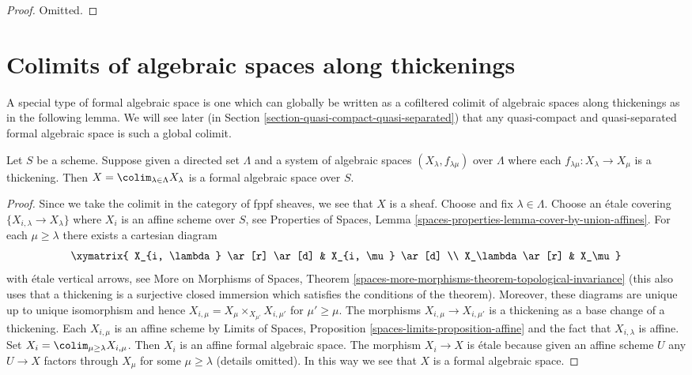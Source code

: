 \begin{proof}
Omitted.
\end{proof}






\section{Colimits of algebraic spaces along thickenings}
\label{section-global-colimits}

\noindent
A special type of formal algebraic space is one which can globally
be written as a cofiltered colimit of algebraic spaces along
thickenings as in the following lemma. We will see later
(in Section \ref{section-quasi-compact-quasi-separated})
that any quasi-compact and quasi-separated formal algebraic space
is such a global colimit.

\begin{lemma}
\label{lemma-colimit-is-formal}
Let $S$ be a scheme. Suppose given a directed set
$\Lambda$ and a system of algebraic spaces $(X_\lambda, f_{\lambda \mu})$
over $\Lambda$ where each $f_{\lambda \mu} : X_\lambda \to X_\mu$ is a
thickening. Then $X = \colim_{\lambda \in \Lambda} X_\lambda$
is a formal algebraic space over $S$.
\end{lemma}

\begin{proof}
Since we take the colimit in the category of fppf sheaves, we
see that $X$ is a sheaf. Choose and fix $\lambda \in \Lambda$. Choose an
\'etale covering $\{X_{i, \lambda} \to X_\lambda\}$ where $X_i$ is an affine
scheme over $S$, see Properties of Spaces, Lemma
\ref{spaces-properties-lemma-cover-by-union-affines}.
For each $\mu \geq \lambda$ there exists a cartesian diagram
$$
\xymatrix{
X_{i, \lambda} \ar[r] \ar[d] & X_{i, \mu} \ar[d] \\
X_\lambda \ar[r] & X_\mu
}
$$
with \'etale vertical arrows, see
More on Morphisms of Spaces, Theorem
\ref{spaces-more-morphisms-theorem-topological-invariance}
(this also uses that a thickening is a surjective closed immersion which
satisfies the conditions of the theorem). Moreover, these diagrams are
unique up to unique isomorphism and hence
$X_{i, \mu} = X_\mu \times_{X_{\mu'}} X_{i, \mu'}$ for
$\mu' \geq \mu$. The morphisms $X_{i, \mu} \to X_{i, \mu'}$
is a thickening as a base change of a thickening. Each $X_{i, \mu}$
is an affine scheme by Limits of Spaces, Proposition
\ref{spaces-limits-proposition-affine} and the fact that
$X_{i, \lambda}$ is affine.
Set $X_i = \colim_{\mu \geq \lambda} X_{i, \mu}$. Then $X_i$ is
an affine formal algebraic space. The morphism $X_i \to X$
is \'etale because given an affine scheme $U$ any $U \to X$
factors through $X_\mu$ for some $\mu \geq \lambda$ (details omitted).
In this way we see that $X$ is a formal algebraic space.
\end{proof}

